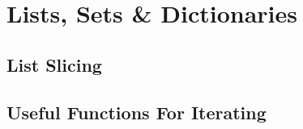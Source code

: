 \section{Lists, Sets \& Dictionaries}

  \subsection{List Slicing}

  \subsection{Useful Functions For Iterating}